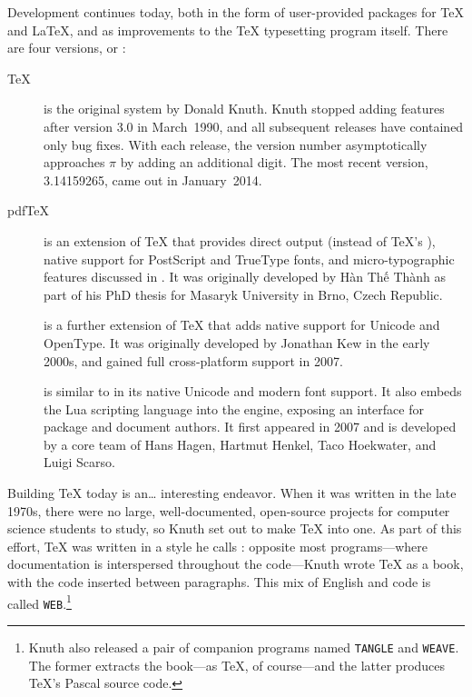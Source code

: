 Development continues today,
both in the form of user-provided packages for \TeX{} and \LaTeX{},
and as improvements to the \TeX{} typesetting program itself.
There are four versions, or :
\begin{description}
\item[\TeX] is the original system by Donald Knuth.
Knuth stopped adding features after version 3.0 in March~1990,
and all subsequent releases have contained only bug fixes.
With each release, the version number asymptotically approaches $\pi$
by adding an additional digit.
The most recent version, 3.14159265, came out in January~2014.

\item[pdf\TeX] is an extension of \TeX{} that provides direct 
    output (instead of \TeX's ),
    native support for PostScript
    and TrueType fonts,
    and micro-typographic features discussed in .
    It was originally developed by
    Hàn Thế Thành
    as part of his PhD thesis
    for Masaryk University in Brno, Czech Republic.\punckern{}

\item[\XeTeX] is a further extension of \TeX{} that adds native support for
    Unicode and OpenType.
    It was originally developed by Jonathan Kew in the early 2000s,
    and gained full cross-platform support in 2007.\punckern{}

\item[\LuaTeX] is similar to \XeTeX{} in its native Unicode and modern font support.
    It also embeds the Lua scripting language into the engine,
    exposing an interface for package and document authors.
    It first appeared in 2007 and is developed by a core team of
    Hans Hagen, Hartmut Henkel, Taco Hoekwater,
    and Luigi Scarso.\punckern{}
\end{description}

Building \TeX{} today is an\dots{} interesting endeavor.
When it was written in the late 1970s,
there were no large, well-documented, open-source projects for computer science
students to study,
so Knuth set out to make \TeX{} into one.
As part of this effort, \TeX{} was written in a style he calls
: opposite most programs---where
documentation is interspersed throughout the code---Knuth wrote \TeX{} as a book,
with the code inserted between paragraphs.
This mix of English and code is called \texttt{WEB}.\punckern\footnote{Knuth
also released a pair of companion programs named
\texttt{TANGLE} and \texttt{WEAVE}.
The former extracts the book---as \TeX, of course---and the latter
produces \TeX's Pascal source code.}

